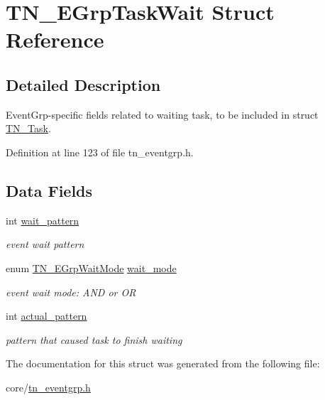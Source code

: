 \hypertarget{structTN__EGrpTaskWait}{\section{T\+N\+\_\+\+E\+Grp\+Task\+Wait Struct Reference}
\label{structTN__EGrpTaskWait}
}


\subsection{Detailed Description}
Event\+Grp-\/specific fields related to waiting task, to be included in struct \hyperlink{structTN__Task}{T\+N\+\_\+\+Task}. 

Definition at line 123 of file tn\+\_\+eventgrp.\+h.

\subsection*{Data Fields}
\begin{DoxyCompactItemize}
\item 
\hypertarget{structTN__EGrpTaskWait_a25abc78711ccf62b85122e126efb3b5d}{int \hyperlink{structTN__EGrpTaskWait_a25abc78711ccf62b85122e126efb3b5d}{wait\+\_\+pattern}}\label{structTN__EGrpTaskWait_a25abc78711ccf62b85122e126efb3b5d}

\begin{DoxyCompactList}\small\item\em event wait pattern \end{DoxyCompactList}\item 
\hypertarget{structTN__EGrpTaskWait_a0f62cf02ae71ab6a79b01f28f48854f8}{enum \hyperlink{tn__eventgrp_8h_a9d42ee61ae8da342f1cd6440b7e54bbd}{T\+N\+\_\+\+E\+Grp\+Wait\+Mode} \hyperlink{structTN__EGrpTaskWait_a0f62cf02ae71ab6a79b01f28f48854f8}{wait\+\_\+mode}}\label{structTN__EGrpTaskWait_a0f62cf02ae71ab6a79b01f28f48854f8}

\begin{DoxyCompactList}\small\item\em event wait mode\+: {\ttfamily A\+N\+D} or {\ttfamily O\+R} \end{DoxyCompactList}\item 
\hypertarget{structTN__EGrpTaskWait_a752450e486d254359ea5ee48c9a43d08}{int \hyperlink{structTN__EGrpTaskWait_a752450e486d254359ea5ee48c9a43d08}{actual\+\_\+pattern}}\label{structTN__EGrpTaskWait_a752450e486d254359ea5ee48c9a43d08}

\begin{DoxyCompactList}\small\item\em pattern that caused task to finish waiting \end{DoxyCompactList}\end{DoxyCompactItemize}


The documentation for this struct was generated from the following file\+:\begin{DoxyCompactItemize}
\item 
core/\hyperlink{tn__eventgrp_8h}{tn\+\_\+eventgrp.\+h}\end{DoxyCompactItemize}
